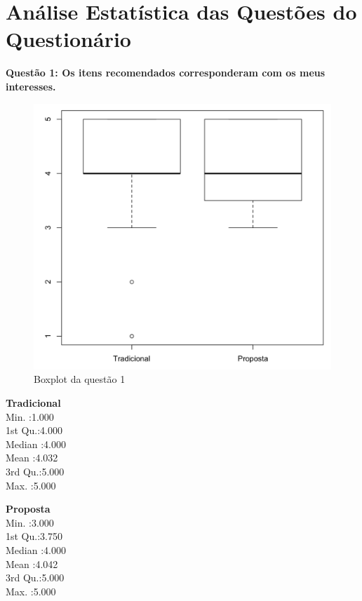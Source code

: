 \chapter{Análise Estatística das Questões do Questionário}\label{ape:analise-estatistica-questionario}

\textbf{Questão 1: Os itens recomendados corresponderam com os meus interesses.}

\begin{figure}[htb]
  \caption{\label{fig:questao1-boxplot}Boxplot da questão 1}
  \begin{center}
      \includegraphics[scale=0.4]{./Figuras/questao1-boxplot.png}
  \end{center}
\end{figure}

\begin{multicols}{2}

\noindent\textbf{Tradicional}\\
Min.   :1.000\\
1st Qu.:4.000\\
Median :4.000\\
Mean   :4.032\\
3rd Qu.:5.000\\
Max.   :5.000\\
\columnbreak

\noindent\textbf{Proposta}\\
Min.   :3.000\\
1st Qu.:3.750\\
Median :4.000\\
Mean   :4.042\\
3rd Qu.:5.000\\
Max.   :5.000
\end{multicols}

